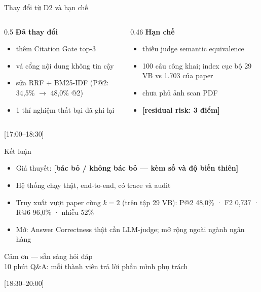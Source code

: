 \documentclass[aspectratio=169,10pt]{beamer}
\newcommand{\TODO}[1]{\textcolor{accent}{\textbf{[#1]}}}
\newcommand{\tm}[1]{\hfill{\scriptsize\color{gray}[#1]}}
\begin{document}
\begin{frame}{Thay đổi từ D2 và hạn chế}
  \begin{columns}[T]
    \begin{column}{0.5\textwidth}
      \textbf{Đã thay đổi}
      \begin{itemize}
        \item thêm Citation Gate top-3
        \item vá cổng nội dung không tin cậy
        \item sửa RRF + BM25-IDF (P@2: 34,5\% $\to$ 48,0\% @2)
        \item 1 thí nghiệm thất bại đã ghi lại
      \end{itemize}
    \end{column}
    \begin{column}{0.46\textwidth}
      \textbf{Hạn chế}
      \begin{itemize}
        \item thiếu judge semantic equivalence
        \item 100 câu công khai; index cục bộ 29 VB vs 1.703 của paper
        \item chưa phủ ảnh scan PDF
        \item \TODO{residual risk: 3 điểm}
      \end{itemize}
    \end{column}
  \end{columns}
  \tm{17:00–18:30}
\end{frame}

\begin{frame}{Kết luận}
  \begin{itemize}
    \item Giả thuyết: \TODO{bác bỏ / không bác bỏ — kèm số và độ biến thiên}
    \item Hệ thống chạy thật, end-to-end, có trace và audit
    \item Truy xuất vượt paper cùng $k=2$ (trên tập 29 VB): P@2 48,0\% · F2 0,737 · R@6 96,0\% · nhiễu 52\%
    \item Mở: Answer Correctness thật cần LLM-judge; mở rộng ngoài ngành ngân hàng
  \end{itemize}
  \vspace{1em}
  \begin{center}
    \Large Cảm ơn — sẵn sàng hỏi đáp\\[0.3em]
    \normalsize\color{gray}10 phút Q\&A: mỗi thành viên trả lời phần mình phụ trách
  \end{center}
  \tm{18:30–20:00}
\end{frame}
\end{document}
